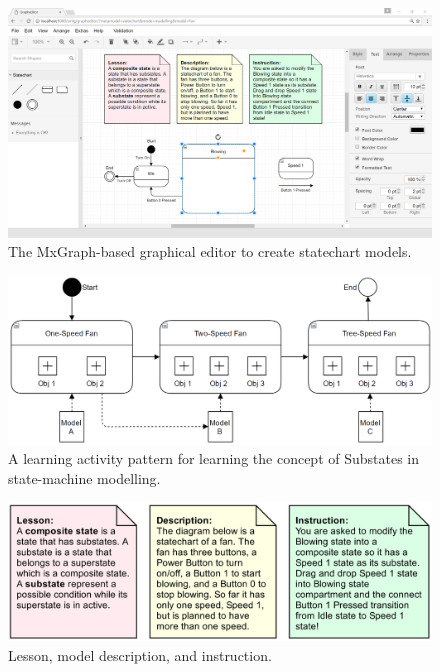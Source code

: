 \documentclass[conference]{IEEEtran}
\begin{document}
\begin{figure}[!t]
\centering
\includegraphics[width=\linewidth]{ide}
\caption{The MxGraph-based graphical editor to create statechart models.}
\label{ide}
\end{figure}

\begin{figure}[!t]
\centering
\includegraphics[width=\linewidth]{eoml}
\caption{A learning activity pattern for learning the concept of Substates in state-machine modelling.}
\label{eoml}
\end{figure}

\begin{figure}[!t]
\centering
\includegraphics[width=\linewidth]{example-01a}
\caption{Lesson, model description, and instruction.}
\label{example-01a}
\end{figure}
\end{document}
